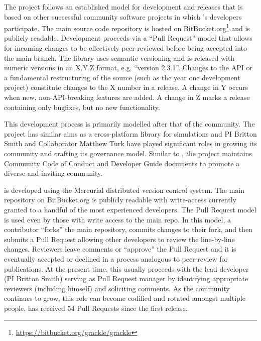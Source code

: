 The \grackle{} project follows an established model for development
and releases that is based on other successful community software
projects in which \grackle{}'s developers participate.  The main
source code repository is hosted on
BitBucket.org\footnote{\url{https://bitbucket.org/grackle/grackle}}
and is publicly readable.  Development proceeds via a ``Pull Request''
model that allows for incoming changes to be effectively peer-reviewed
before  being accepted into the main branch.  The \grackle{} library
uses semantic versioning and
is released with numeric versions in an X.Y.Z format, e.g. ``version
2.3.1''.  Changes to the \grackle{} API or a fundamental restructuring
of the source (such as the year one development project) constitute
changes to the X number in a release.  A change in Y occurs when new,
non-API-breaking features are added.  A change in Z marks a release
containing only bugfixes, but no new functionality.

This development process is primarily modelled after that
of the \yt{} community.  The \yt{} project has similar
aims as a cross-platform library for simulations and PI Britton Smith
and Collaborator Matthew Turk have played significant roles in growing
its community and crafting its governance model.  Similar to
\yt{}, the \grackle{} project maintains Community Code of
Conduct and Developer Guide documents to promote a diverse and
inviting community.

\grackle{} is developed using the Mercurial distributed version
control system.  The main repository on BitBucket.org is publicly
readable with write-access currently granted to a handful of the most
experienced developers.  The Pull Request model is used even by those
with write access to the main repo.  In this model, a contributor
``forks'' the main repository, commits changes to their fork, and then
submits a Pull Request allowing other developers to review the
line-by-line changes.  Reviewers leave comments or ``approve'' the
Pull Request and it is eventually accepted or declined in a process
analogous to peer-review for publications.  At the present time, this
usually proceeds with the lead developer (PI Britton Smith) serving as
Pull Request manager by identifying appropriate reviewers (including
himself) and soliciting comments.  As the community continues to grow,
this role can become codified and rotated amongst multiple people.
\grackle{} has received 54 Pull Requests since the first release.

